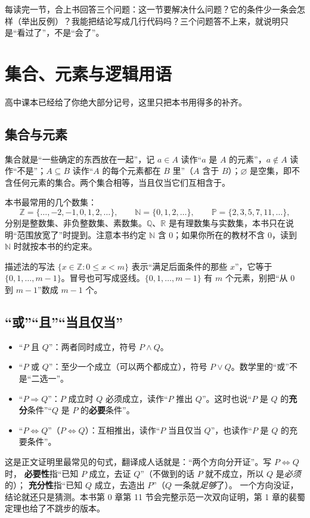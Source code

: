 \documentclass[UTF8,a4paper,11pt,oneside,openany,fontset=fandol]{ctexbook}
\theoremstyle{definition}
\newcommand{\Z}{\mathbb Z}
\newcommand{\N}{\mathbb N}
\newcommand{\Pp}{\mathbb P}
\begin{document}
\begin{tip}[一句话学习方法]
每读完一节，合上书回答三个问题：这一节要解决什么问题？它的条件少一条会怎样（举出反例）？我能把结论写成几行代码吗？三个问题答不上来，就说明只是“看过了”，不是“会了”。
\end{tip}

\section{集合、元素与逻辑用语}
高中课本已经给了你绝大部分记号，这里只把本书用得多的补齐。

\subsection{集合与元素}
集合就是“一些确定的东西放在一起”，记 $a\in A$ 读作“$a$ 是 $A$ 的元素”，$a\notin A$ 读作“不是”；$A\subseteq B$ 读作“$A$ 的每个元素都在 $B$ 里”（$A$ 含于 $B$）；$\varnothing$ 是空集，即不含任何元素的集合。两个集合相等，当且仅当它们互相含于。

本书最常用的几个数集：
\[
\Z=\{\ldots,-2,-1,0,1,2,\ldots\},\qquad \N=\{0,1,2,\ldots\},\qquad \Pp=\{2,3,5,7,11,\ldots\},
\]
分别是整数集、非负整数集、素数集。$\mathbb Q$、$\mathbb R$ 是有理数集与实数集，本书只在说明“范围放宽了”时提到。注意本书约定 $\N$ 含 $0$；如果你所在的教材不含 $0$，读到 $\N$ 时就按本书的约定来。

描述法的写法 $\{x\in\Z:0\le x<m\}$ 表示“满足后面条件的那些 $x$”，它等于 $\{0,1,\ldots,m-1\}$。冒号也可写成竖线。$\{0,1,\ldots,m-1\}$ 有 $m$ 个元素，别把“从 $0$ 到 $m-1$”数成 $m-1$ 个。

\subsection{“或”“且”“当且仅当”}
\begin{itemize}
\item “$P$ 且 $Q$”：两者同时成立，符号 $P\land Q$。
\item “$P$ 或 $Q$”：至少一个成立（可以两个都成立），符号 $P\lor Q$。数学里的“或”不是“二选一”。
\item “$P\Rightarrow Q$”：$P$ 成立时 $Q$ 必须成立，读作“$P$ 推出 $Q$”。这时也说“$P$ 是 $Q$ 的\textbf{充分}条件”“$Q$ 是 $P$ 的\textbf{必要}条件”。
\item “$P\iff Q$”（$P\Leftrightarrow Q$）：互相推出，读作“$P$ 当且仅当 $Q$”，也读作“$P$ 是 $Q$ 的充要条件”。
\end{itemize}

\begin{tip}
这是正文证明里最常见的句式，翻译成人话就是：“两个方向分开证”。写 $P\iff Q$ 时，
\textbf{必要性}指“已知 $P$ 成立，去证 $Q$”（不做到的话 $P$ 就不成立，所以 $Q$ 是\emph{必须}的）；
\textbf{充分性}指“已知 $Q$ 成立，去造出 $P$”（$Q$ 一条就\emph{足够}了）。
一个方向没证，结论就还只是猜测。本书第 0 章第 11 节会完整示范一次双向证明，第 1 章的裴蜀定理也给了不跳步的版本。
\end{tip}
\end{document}

